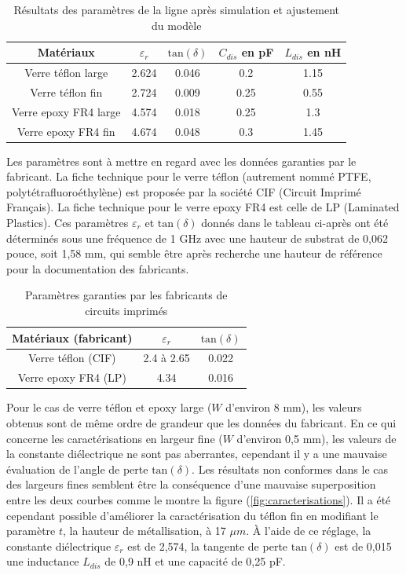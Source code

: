 \documentclass[french]{article}
\begin{document}
\begin{table}[H]
	\centering
	\begin{tabular}{|c|c|c|c|c|}
		\hline
		Matériaux & $\varepsilon_r$ & $\mbox{tan}(\delta)$ & $C_{dis}$ en pF & $L_{dis}$ en nH\\
		\hline
		Verre téflon large & 2.624 & 0.046 & 0.2 & 1.15\\
		\hline
		Verre téflon fin & 2.724 & 0.009 & 0.25 & 0.55\\
		\hline
		Verre epoxy FR4 large & 4.574 & 0.018 & 0.25 & 1.3\\
		\hline
		Verre epoxy FR4 fin & 4.674 & 0.048 & 0.3 & 1.45\\
		\hline
	\end{tabular}
	\caption{Résultats des paramètres de la ligne après simulation et ajustement du modèle}
\end{table}

Les paramètres sont à mettre en regard avec les données garanties par le fabricant. La fiche technique pour le verre téflon (autrement nommé PTFE, polytétrafluoroéthylène) est proposée par la société CIF (Circuit Imprimé Français).\cite{data_PTFE} La fiche technique pour le verre epoxy FR4 est celle de LP (Laminated Plastics).\cite{data_fr4} Ces paramètres $\varepsilon_r$ et $\mbox{tan}(\delta)$ donnés dans le tableau ci-après ont été déterminés sous une fréquence de 1 GHz avec une hauteur de substrat de 0,062 pouce, soit 1,58 mm, qui semble être après recherche une hauteur de référence pour la documentation des fabricants.

\newpage

\begin{table}[H]
	\centering
	\begin{tabular}{|c|c|c|}
		\hline
		Matériaux (fabricant) & $\varepsilon_r$ & $\mbox{tan}(\delta)$\\
		\hline
		Verre téflon (CIF) & 2.4 à 2.65 & 0.022\\
		\hline
		Verre epoxy FR4 (LP) & 4.34 & 0.016\\
		\hline
	\end{tabular}
	\caption{Paramètres garanties par les fabricants de circuits imprimés}
\end{table}

Pour le cas de verre téflon et epoxy large ($W$ d'environ 8 mm), les valeurs obtenus sont de même ordre de grandeur que les données du fabricant. En ce qui concerne les caractérisations en largeur fine ($W$ d'environ 0,5 mm), les valeurs de la constante diélectrique ne sont pas aberrantes, cependant il y a une mauvaise évaluation de l'angle de perte $\mbox{tan}(\delta)$. Les résultats non conformes dans le cas des largeurs fines semblent être la conséquence d'une mauvaise superposition entre les deux courbes comme le montre la figure (\ref{fig:caracterisations}). Il a été cependant possible d'améliorer la caractérisation du téflon fin en modifiant le paramètre $t$, la hauteur de métallisation, à 17 $\mu m$. À l'aide de ce réglage, la constante diélectrique $\varepsilon_r$ est de 2,574, la tangente de perte $\mbox{tan}(\delta)$ est de 0,015 une inductance $L_{dis}$ de 0,9 nH et une capacité de 0,25 pF. 
\end{document}

